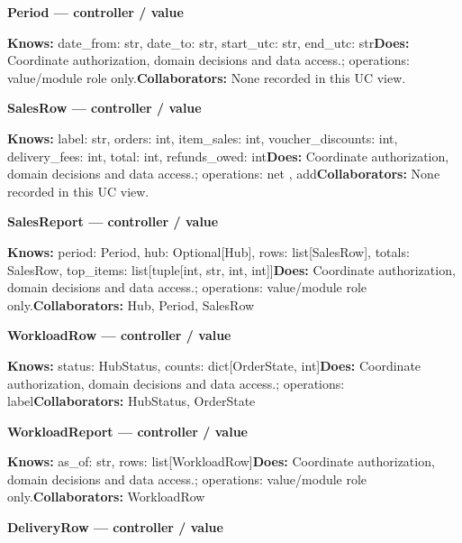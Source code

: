 \textbf{Period --- controller / \guillemotleft{}value\guillemotright{}}

\textbf{Knows:} date\_from: str, date\_to: str, start\_utc: str, end\_utc: str\newline{}\textbf{Does:} Coordinate authorization, domain decisions and data access.; operations: value/module role only.\newline{}\textbf{Collaborators:} None recorded in this UC view.

\textbf{SalesRow --- controller / \guillemotleft{}value\guillemotright{}}

\textbf{Knows:} label: str, orders: int, item\_sales: int, voucher\_discounts: int, delivery\_fees: int, total: int, refunds\_owed: int\newline{}\textbf{Does:} Coordinate authorization, domain decisions and data access.; operations: net , add\newline{}\textbf{Collaborators:} None recorded in this UC view.

\textbf{SalesReport --- controller / \guillemotleft{}value\guillemotright{}}

\textbf{Knows:} period: Period, hub: Optional[Hub], rows: list[SalesRow], totals: SalesRow, top\_items: list[tuple[int, str, int, int]]\newline{}\textbf{Does:} Coordinate authorization, domain decisions and data access.; operations: value/module role only.\newline{}\textbf{Collaborators:} Hub, Period, SalesRow

\textbf{WorkloadRow --- controller / \guillemotleft{}value\guillemotright{}}

\textbf{Knows:} status: HubStatus, counts: dict[OrderState, int]\newline{}\textbf{Does:} Coordinate authorization, domain decisions and data access.; operations: label\newline{}\textbf{Collaborators:} HubStatus, OrderState

\textbf{WorkloadReport --- controller / \guillemotleft{}value\guillemotright{}}

\textbf{Knows:} as\_of: str, rows: list[WorkloadRow]\newline{}\textbf{Does:} Coordinate authorization, domain decisions and data access.; operations: value/module role only.\newline{}\textbf{Collaborators:} WorkloadRow

\textbf{DeliveryRow --- controller / \guillemotleft{}value\guillemotright{}}

